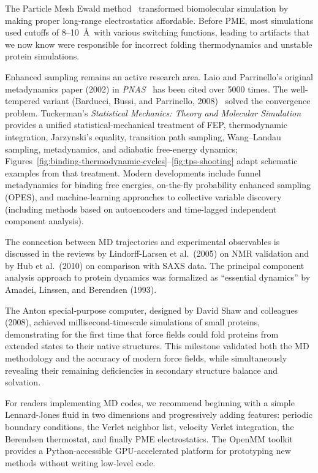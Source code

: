 The Particle Mesh Ewald method~\cite{darden1993} transformed biomolecular simulation by making proper long-range electrostatics affordable. Before PME, most simulations used cutoffs of 8--10~\AA\ with various switching functions, leading to artifacts that we now know were responsible for incorrect folding thermodynamics and unstable protein simulations.

Enhanced sampling remains an active research area. Laio and Parrinello's original metadynamics paper (2002) in \emph{PNAS}~\cite{laio2002} has been cited over 5000 times. The well-tempered variant (Barducci, Bussi, and Parrinello, 2008)~\cite{barducci2008} solved the convergence problem. Tuckerman's \emph{Statistical Mechanics: Theory and Molecular Simulation}~\cite{tuckerman2023} provides a unified statistical-mechanical treatment of FEP, thermodynamic integration, Jarzynski's equality, transition path sampling, Wang--Landau sampling, metadynamics, and adiabatic free-energy dynamics; Figures~\ref{fig:binding-thermodynamic-cycles}--\ref{fig:tps-shooting} adapt schematic examples from that treatment. Modern developments include funnel metadynamics for binding free energies, on-the-fly probability enhanced sampling (OPES), and machine-learning approaches to collective variable discovery (including methods based on autoencoders and time-lagged independent component analysis).

The connection between MD trajectories and experimental observables is discussed in the reviews by Lindorff-Larsen et al.\ (2005) on NMR validation and by Hub et al.\ (2010) on comparison with SAXS data. The principal component analysis approach to protein dynamics was formalized as ``essential dynamics'' by Amadei, Linssen, and Berendsen (1993).

The Anton special-purpose computer, designed by David Shaw and colleagues (2008), achieved millisecond-timescale simulations of small proteins, demonstrating for the first time that force fields could fold proteins from extended states to their native structures. This milestone validated both the MD methodology and the accuracy of modern force fields, while simultaneously revealing their remaining deficiencies in secondary structure balance and solvation.

For readers implementing MD codes, we recommend beginning with a simple Lennard-Jones fluid in two dimensions and progressively adding features: periodic boundary conditions, the Verlet neighbor list, velocity Verlet integration, the Berendsen thermostat, and finally PME electrostatics. The OpenMM toolkit provides a Python-accessible GPU-accelerated platform for prototyping new methods without writing low-level code.
